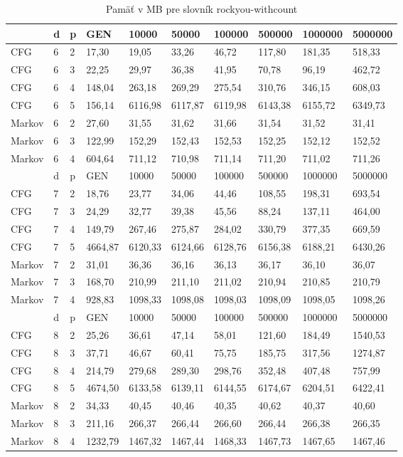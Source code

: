 \begin{table}[]
\centering
\caption{Pamäť v MB pre slovník rockyou-withcount}
\label{tbl:rockyouMemory}
\begin{tabular}{lll|lllllll}
       & d & p & GEN     & 10000  & 50000  & 100000 & 500000 & 1000000 & 5000000 \\ \hline
CFG    & 6 & 2 & 17,30   & 19,05  & 33,26  & 46,72  & 117,80 & 181,35  & 518,33 \\
CFG    & 6 & 3 & 22,25    & 29,97  & 36,38  & 41,95  & 70,78 & 96,19  & 462,72 \\
CFG    & 6 & 4 & 148,04   & 263,18  & 269,29   & 275,54  & 310,76 & 346,15  & 608,03 \\
CFG    & 6 & 5 & 156,14 & 6116,98 & 6117,87 & 6119,98 & 6143,38 & 6155,72 & 6349,73 \\
Markov & 6 & 2 & 27,60     & 31,55  & 31,62  & 31,66  & 31,54 & 31,52  & 31,41 \\
Markov & 6 & 3 & 122,99     & 152,29  & 152,43  & 152,53  & 152,25 & 152,12 & 152,52 \\
Markov & 6 & 4 & 604,64     & 711,12  & 710,98  & 711,14 & 711,20 & 711,02 & 711,26 \\ \hline
       & d & p & GEN     & 10000  & 50000  & 100000 & 500000 & 1000000 & 5000000 \\ \hline
CFG    & 7 & 2 & 18,76    & 23,77  & 34,06  & 44,46  & 108,55  & 198,31  & 693,54 \\
CFG    & 7 & 3 & 24,29   & 32,77   & 39,38  & 45,56  & 88,24 & 137,11  & 464,00 \\
CFG    & 7 & 4 & 149,79   & 267,46  & 275,87  & 284,02  & 330,79 & 377,35  & 669,59 \\
CFG    & 7 & 5 & 4664,87 & 6120,33 & 6124,66 & 6128,76 & 6156,38 & 6188,21 & 6430,26 \\
Markov & 7 & 2 & 31,01    & 36,36  & 36,16  & 36,13 & 36,17  & 36,10  & 36,07 \\
Markov & 7 & 3 & 168,70     & 210,99 & 211,10  & 211,02 & 210,94 & 210,85  & 210,79  \\
Markov & 7 & 4 & 928,83     & 1098,33   & 1098,08 & 1098,03 & 1098,09 & 1098,05  & 1098,26 \\ \hline
       & d & p & GEN     & 10000  & 50000  & 100000 & 500000 & 1000000 & 5000000 \\ \hline
CFG    & 8 & 2 & 25,26   & 36,61  & 47,14  & 58,01  & 121,60 & 184,49  & 1540,53 \\
CFG    & 8 & 3 & 37,71   & 46,67  & 60,41   & 75,75  & 185,75 & 317,56  & 1274,87 \\
CFG    & 8 & 4 & 214,79   & 279,68  & 289,30  & 298,76  & 352,48 & 407,48  & 757,99 \\
CFG    & 8 & 5 & 4674,50 & 6133,58 & 6139,11 & 6144,55 & 6174,67 & 6204,51 & 6422,41 \\
Markov & 8 & 2 & 34,33     & 40,45  & 40,46  & 40,35 & 40,62 & 40,37 & 40,60 \\
Markov & 8 & 3 & 211,16    & 266,37  & 266,44  & 266,60 & 266,44 & 266,38  & 266,35 \\
Markov & 8 & 4 & 1232,79   & 1467,32 & 1467,44 & 1468,33 & 1467,73 & 1467,65  & 1467,46
\end{tabular}
\end{table} 

